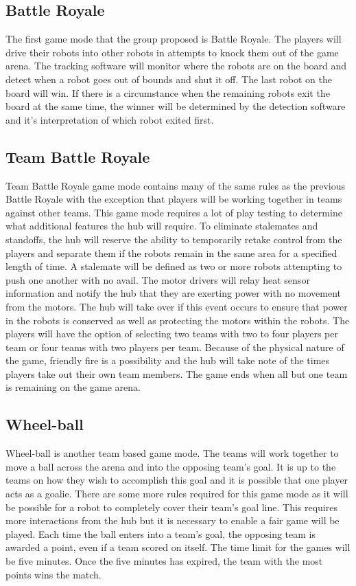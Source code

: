 \documentclass[11pt]{ieeeconf}
\begin{document}
\subsection{Battle Royale}

The first game mode that the group proposed is Battle Royale. The players will drive their robots into other robots in attempts to knock them out of the game arena. The tracking software will monitor where the robots are on the board and detect when a robot goes out of bounds and shut it off. The last robot on the board will win. If there is a circumstance when the remaining robots exit the board at the same time, the winner will be determined by the detection software and it's interpretation of which robot exited first.  

\subsection{Team Battle Royale}

Team Battle Royale game mode contains many of the same rules as the previous Battle Royale with the exception that players will be working together in teams against other teams. This game mode requires a lot of play testing to determine what additional features the hub will require. To eliminate stalemates and standoffs, the hub will reserve the ability to temporarily retake control from the players and separate them if the robots remain in the same area for a specified length of time. A stalemate will be defined as two or more robots attempting to push one another with no avail. The motor drivers will relay heat sensor information and notify the hub that they are exerting power with no movement from the motors. The hub will take over if this event occurs to ensure that power in the robots is conserved as well as protecting the motors within the robots. The players will have the option of selecting two teams with two to four players per team or four teams with two players per team. Because of the physical nature of the game, friendly fire is a possibility and the hub will take note of the times players take out their own team members. The game ends when all but one team is remaining on the game arena. 

\subsection{Wheel-ball}

Wheel-ball is another team based game mode. The teams will work together to move a ball across the arena and into the opposing team's goal. It is up to the teams on how they wish to accomplish this goal and it is possible that one player acts as a goalie. There are some more rules required for this game mode as it will be possible for a robot to completely cover their team's goal line. This requires more interactions from the hub but it is necessary to enable a fair game will be played. Each time the ball enters into a team's goal, the opposing team is awarded a point, even if a team scored on itself. The time limit for the games will be five minutes. Once the five minutes has expired, the team with the most points wins the match.
\end{document}
